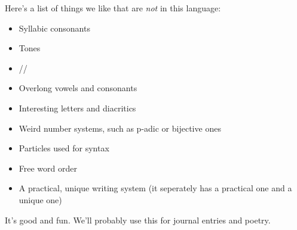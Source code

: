 Here's a list of things we like that are \emph{not} in this language:
\begin{itemize}
  \item Syllabic consonants
  \item Tones
  \item //
  \item Overlong vowels and consonants
  \item Interesting letters and diacritics
  \item Weird number systems, such as p-adic or bijective ones
  \item Particles used for syntax
  \item Free word order
  \item A practical, unique writing system (it seperately has a practical one
    and a unique one)
\end{itemize}
It's good and fun. We'll probably use this for journal entries and poetry.
